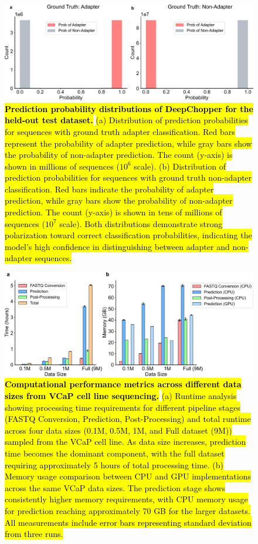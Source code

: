 \documentclass[pdflatex,sn-nature, lineno]{sn-jnl}%
\begin{document}
\begin{figure}[!ht]
	\includegraphics[height=0.35\columnwidth]{finals/adaprob}
	\caption{{\bf \hl{Prediction probability distributions of DeepChopper for the held-out test dataset.}} \hl{(a) Distribution of prediction probabilities for sequences with ground truth adapter classification. Red bars represent the probability of adapter prediction, while gray bars show the probability of non-adapter prediction. The count (y-axis) is shown in millions of sequences ($10^6$ scale). (b) Distribution of prediction probabilities for sequences with ground truth non-adapter classification. Red bars indicate the probability of adapter prediction, while gray bars show the probability of non-adapter prediction. The count (y-axis) is shown in tens of millions of sequences ($10^7$ scale). Both distributions demonstrate strong polarization toward correct classification probabilities, indicating the model's high confidence in distinguishing between adapter and non-adapter sequences.}}\label{fig:adaprob}
\end{figure}

\begin{figure}[!ht]
	\includegraphics[height=0.4\columnwidth]{finals/sf2a}
	\caption{ {\bf \hl{Computational performance metrics across different data sizes from VCaP cell line sequencing.}} \hl{(a) Runtime analysis showing processing time requirements for different pipeline stages (FASTQ Conversion, Prediction, Post-Processing) and total runtime across four data sizes (0.1M, 0.5M, 1M, and Full dataset (9M)) sampled from the VCaP cell line. As data size increases, prediction time becomes the dominant component, with the full dataset requiring approximately 5 hours of total processing time. (b) Memory usage comparison between CPU and GPU implementations across the same VCaP data sizes. The prediction stage shows consistently higher memory requirements, with CPU memory usage for prediction reaching approximately 70 GB for the larger datasets. All measurements include error bars representing standard deviation from three runs.}}\label{fig:sf2a}
\end{figure}
\end{document}
